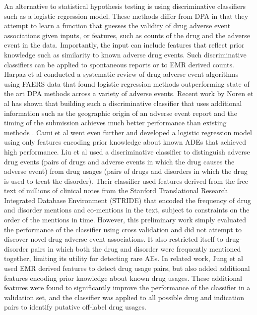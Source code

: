 An alternative to statistical hypothesis testing is using
discriminative classifiers such as a logistic regression model. These
methods differ from DPA in that they attempt to learn a function that
guesses the validity of drug adverse event associations given inputs,
or features, such as counts of the drug and the adverse event in the
data. Importantly, the input can include features that reflect prior
knowledge such as similarity to known adverse drug events. Such
discriminative classifiers can be applied to spontaneous reports or to
EMR derived counts. Harpaz et al \cite{Harpaz2013} conducted a
systematic review of drug adverse event algorithms using FAERS data
that found logistic regression methods outperforming state of
the art DPA methods across a variety of adverse events. Recent work by
Noren et al has shown that building such a discriminative classifier
that uses additional information such as the geographic origin of an
adverse event report and the timing of the submission achieves much
better performance than existing methods
\cite{Caster2014,Caster2013,Harpaz2013b}. Cami et al \cite{Cami2011}
went even further and developed a logistic regression model using only
features encoding prior knowledge about known ADEs that achieved high
performance.  Liu et al \cite{Li2011} used a discriminative classifier
to distinguish adverse drug events (pairs of drugs and adverse events
in which the drug causes the adverse event) from drug usages (pairs of
drugs and disorders in which the drug is used to treat the
disorder). Their classifier used features derived from the free text
of millions of clinical notes from the Stanford Translational Research
Integrated Database Environment (STRIDE) \cite{Lowe2009} that encoded
the frequency of drug and disorder mentions and co-mentions in the
text, subject to constraints on the order of the mentions in
time. However, this preliminary work simply evaluated the performance
of the classifier using cross validation and did not attempt to
discover novel drug adverse event associations. It also restricted
itself to drug-disorder pairs in which both the drug and disorder were
frequently mentioned together, limiting its utility for detecting rare
AEs. In related work, Jung et al \cite{Jung2014} used EMR derived
features to detect drug usage pairs, but also added additional
features encoding prior knowledge about known drug usages. These
additional features were found to significantly improve the
performance of the classifier in a validation set, and the classifier
was applied to all possible drug and indication pairs to identify
putative off-label drug usages.

